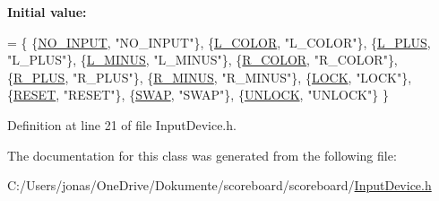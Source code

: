 {\bfseries Initial value\+:}
\begin{DoxyCode}
= 
    \{
    \{\hyperlink{class_input_device_a75152d8f06b6d032036014e42e44688ba2f18b34092c7ee0bb0a8905d1eb0a932}{NO\_INPUT}, \textcolor{stringliteral}{"NO\_INPUT"}\},
    \{\hyperlink{class_input_device_a75152d8f06b6d032036014e42e44688ba62e8e3a8805c10a1aeafdf32508a363d}{L\_COLOR}, \textcolor{stringliteral}{"L\_COLOR"}\},
    \{\hyperlink{class_input_device_a75152d8f06b6d032036014e42e44688ba2dfac8e357208426c5557646fc4851bc}{L\_PLUS}, \textcolor{stringliteral}{"L\_PLUS"}\},
    \{\hyperlink{class_input_device_a75152d8f06b6d032036014e42e44688ba0a6c0f0f21ce6b32c7f9bf45c268ed7d}{L\_MINUS}, \textcolor{stringliteral}{"L\_MINUS"}\},
    \{\hyperlink{class_input_device_a75152d8f06b6d032036014e42e44688ba55ff3df43eb079f61c3de4c26e891484}{R\_COLOR}, \textcolor{stringliteral}{"R\_COLOR"}\},
    \{\hyperlink{class_input_device_a75152d8f06b6d032036014e42e44688ba01c5d472c59979ad6c0ed0515e4f0b76}{R\_PLUS}, \textcolor{stringliteral}{"R\_PLUS"}\},
    \{\hyperlink{class_input_device_a75152d8f06b6d032036014e42e44688bafaf17bc1c44227054bb36ff122009380}{R\_MINUS}, \textcolor{stringliteral}{"R\_MINUS"}\},
    \{\hyperlink{class_input_device_a75152d8f06b6d032036014e42e44688ba6505274aefdffec5baf47c150aa2d87a}{LOCK}, \textcolor{stringliteral}{"LOCK"}\},
    \{\hyperlink{class_input_device_a75152d8f06b6d032036014e42e44688ba906dded9cca7bddf13e5b394c4aa66ed}{RESET}, \textcolor{stringliteral}{"RESET"}\},
    \{\hyperlink{class_input_device_a75152d8f06b6d032036014e42e44688ba4ff7ca0942a282a8006d53cd81ee4ba4}{SWAP}, \textcolor{stringliteral}{"SWAP"}\},
    \{\hyperlink{class_input_device_a75152d8f06b6d032036014e42e44688badfdd07b1c95cf33f16d73314282ee81d}{UNLOCK}, \textcolor{stringliteral}{"UNLOCK"}\}
    \}
\end{DoxyCode}


Definition at line 21 of file Input\+Device.\+h.



The documentation for this class was generated from the following file\+:\begin{DoxyCompactItemize}
\item 
C\+:/\+Users/jonas/\+One\+Drive/\+Dokumente/scoreboard/scoreboard/\hyperlink{_input_device_8h}{Input\+Device.\+h}\end{DoxyCompactItemize}
